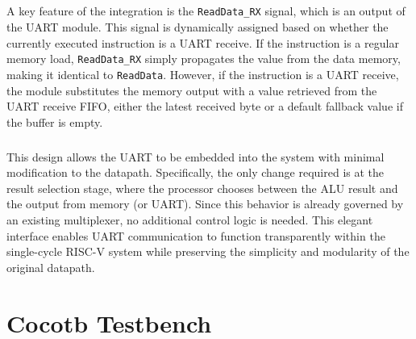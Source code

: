 \documentclass[12pt]{report}
\begin{document}
\paragraph{}
A key feature of the integration is the \texttt{ReadData\_RX} signal, which is an output of the UART module. This signal is dynamically assigned based on whether the currently executed instruction is a UART receive. If the instruction is a regular memory load, \texttt{ReadData\_RX} simply propagates the value from the data memory, making it identical to \texttt{ReadData}. However, if the instruction is a UART receive, the module substitutes the memory output with a value retrieved from the UART receive FIFO, either the latest received byte or a default fallback value if the buffer is empty.

\paragraph{}
This design allows the UART to be embedded into the system with minimal modification to the datapath. Specifically, the only change required is at the result selection stage, where the processor chooses between the ALU result and the output from memory (or UART). Since this behavior is already governed by an existing multiplexer, no additional control logic is needed. This elegant interface enables UART communication to function transparently within the single-cycle RISC-V system while preserving the simplicity and modularity of the original datapath.


\chapter{Cocotb Testbench}
\end{document}
